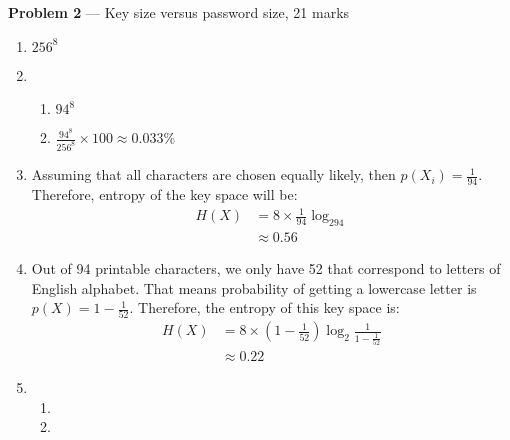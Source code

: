 \documentclass[11pt]{article}
\newcommand{\logbin}{\log_2}
\theoremstyle{definition}
\begin{document}
\item[] \textbf{Problem 2} --- Key size versus password size, 21 marks
\begin{enumerate}
  \item $256^8$
  
  \item 
    \begin{enumerate}
      \item $94^8$
      \item $\frac{94^8}{256^8} \times 100 \approx 0.033\%$
    \end{enumerate}
  
  \item
    Assuming that all characters are chosen equally likely, then $p(X_i) = \frac{1}{94}$. Therefore, entropy of the key space will be:
    \begin{equation*}
    \begin{aligned}
      H(X) &= 8 \times \frac{1}{94}\logbin 94 \\
           &\approx 0.56
    \end{aligned}
    \end{equation*}

  \item
    Out of 94 printable characters, we only have 52 that correspond to letters of English alphabet. That means probability of getting a lowercase letter is $p(X) = 1 - \frac{1}{52}$. Therefore, the entropy of this key space is:
    \begin{equation*}
    \begin{aligned}
      H(X) &= 8 \times (1 - \frac{1}{52})\logbin {\frac{1}{1 - \frac{1}{52}}} \\
           &\approx 0.22
    \end{aligned}
    \end{equation*}

  \item
    \begin{enumerate}
      \item
      \item
    \end{enumerate}

\end{enumerate}
\newpage
\end{document}
